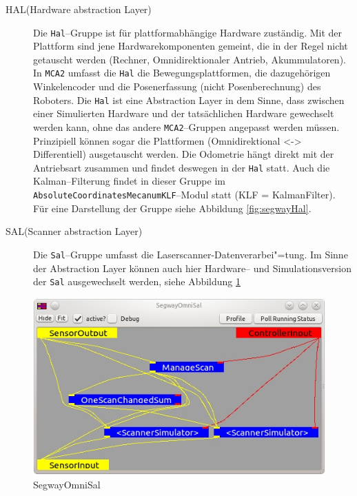 \begin{description}
\item[HAL(Hardware abstraction Layer)] Die \lstinline{Hal}--Gruppe ist für
 plattformabhängige Hardware zuständig.
 Mit der Plattform sind jene Hardwarekomponenten gemeint, die in der Regel nicht getauscht werden 
 (Rechner, Omnidirektionaler Antrieb, Akummulatoren).
 In \lstinline{MCA2} umfasst die \lstinline{Hal} die Bewegungsplattformen, die dazugehörigen
 Winkelencoder und die Posenerfassung (nicht Posenberechnung) des Roboters. Die \lstinline{Hal} ist eine Abstraction Layer in dem Sinne, dass zwischen einer Simulierten
 Hardware und der tatsächlichen Hardware gewechselt werden kann, ohne das andere
 \lstinline{MCA2}--Gruppen angepasst werden müssen.
 Prinzipiell können sogar die Plattformen (Omnidirektional <-> Differentiell) ausgetauscht werden. Die Odometrie hängt
 direkt mit der Antriebsart zusammen und findet deswegen in der \lstinline{Hal} statt.
 Auch die Kalman--Filterung findet in dieser Gruppe im
 \lstinline{AbsoluteCoordinatesMecanumKLF}--Modul statt (KLF = KalmanFilter). Für
 eine Darstellung der Gruppe siehe Abbildung \ref{fig:segwayHal}.
\item[SAL(Scanner abstraction Layer)] Die \lstinline{Sal}--Gruppe umfasst die
Laserscanner-Datenverarbei"=tung.
 Im Sinne der Abstraction Layer können auch hier Hardware-- und
 Simulationsversion der \lstinline{Sal} ausgewechselt werden, siehe Abbildung
 \ref{fig:SegwayOmniSal}
\end{description}
\begin{figure}[h]
\center
\includegraphics[scale=0.7]{graphics/SegwayOmniSal.jpg}
\caption{\label{fig:SegwayOmniSal} SegwayOmniSal}
\end{figure}


